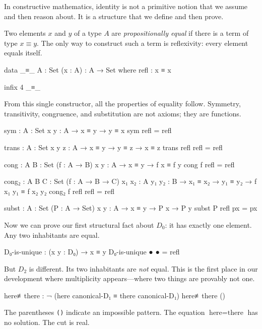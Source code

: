 \documentclass[11pt,a4paper]{book}
\begin{document}
In constructive mathematics, identity is not a primitive notion that we 
assume and then reason about. It is a structure that we define and then 
prove.

Two elements $x$ and $y$ of a type $A$ are \emph{propositionally equal} if 
there is a term of type $x \equiv y$. The only way to construct such a 
term is reflexivity: every element equals itself.

\begin{code}
data _≡_ {A : Set} (x : A) : A → Set where
  refl : x ≡ x

infix 4 _≡_
\end{code}

From this single constructor, all the properties of equality follow. 
Symmetry, transitivity, congruence, and substitution are not axioms; they 
are functions.

\begin{code}
sym : {A : Set} {x y : A} → x ≡ y → y ≡ x
sym refl = refl

trans : {A : Set} {x y z : A} → x ≡ y → y ≡ z → x ≡ z
trans refl refl = refl

cong : {A B : Set} (f : A → B) {x y : A} → x ≡ y → f x ≡ f y
cong f refl = refl

cong₂ : {A B C : Set} (f : A → B → C) {x₁ x₂ : A} {y₁ y₂ : B} 
      → x₁ ≡ x₂ → y₁ ≡ y₂ → f x₁ y₁ ≡ f x₂ y₂
cong₂ f refl refl = refl

subst : {A : Set} (P : A → Set) {x y : A} → x ≡ y → P x → P y
subst P refl px = px
\end{code}

Now we can prove our first structural fact about $D_0$: it has exactly one 
element. Any two inhabitants are equal.

\begin{code}
D₀-is-unique : (x y : D₀) → x ≡ y
D₀-is-unique ● ● = refl
\end{code}

But $D_2$ is different. Its two inhabitants are \emph{not} equal. This is 
the first place in our development where multiplicity appears---where two 
things are provably not one.

\begin{code}
here≢there : ¬ (here canonical-D₁ ≡ there canonical-D₁)
here≢there ()
\end{code}

The parentheses \texttt{()} indicate an impossible pattern. The equation 
$\text{here} = \text{there}$ has no solution. The cut is real.
\end{document}
